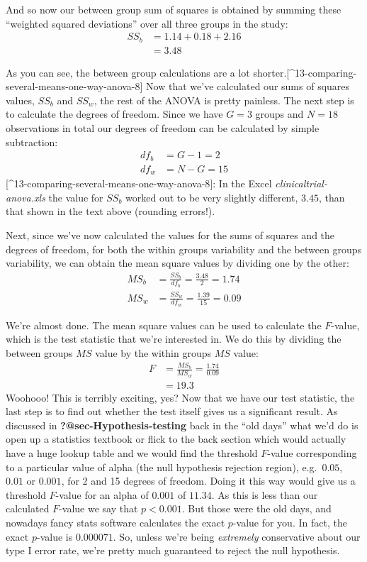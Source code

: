 \documentclass[
  a4paper,
]{book}
\begin{document}
And so now our between group sum of squares is obtained by summing these
``weighted squared deviations'' over all three groups in the study:
\[\begin{aligned} SS_b & = 1.14 + 0.18 + 2.16 \\ &= 3.48 \end{aligned}\]

As you can see, the between group calculations are a lot
shorter.{[}\^{}13-comparing-several-means-one-way-anova-8{]} Now that
we've calculated our sums of squares values, \(SS_b\) and \(SS_w\), the
rest of the ANOVA is pretty painless. The next step is to calculate the
degrees of freedom. Since we have \(G = 3\) groups and \(N = 18\)
observations in total our degrees of freedom can be calculated by simple
subtraction: \[
\begin{split}
df_b & = G-1 = 2 \\
df_w & = N-G = 15
\end{split}
\] {[}\^{}13-comparing-several-means-one-way-anova-8{]}: In the Excel
\emph{clinicaltrial-anova.xls} the value for \(SS_b\) worked out to be
very slightly different, \(3.45\), than that shown in the text above
(rounding errors!).

Next, since we've now calculated the values for the sums of squares and
the degrees of freedom, for both the within groups variability and the
between groups variability, we can obtain the mean square values by
dividing one by the other: \[
\begin{split}
MS_b & = \frac{SS_b}{df_b} = \frac{3.48}{2} = 1.74 \\
MS_w & = \frac{SS_w}{df_w} = \frac{1.39}{15} = 0.09
\end{split}
\]

We're almost done. The mean square values can be used to calculate the
\(F\)-value, which is the test statistic that we're interested in. We do
this by dividing the between groups \(MS\) value by the within groups
\(MS\) value: \[
\begin{split}
F & = \frac{MS_b}{MS_w}  = \frac{1.74}{0.09} \\
& = 19.3
\end{split}
\] Woohooo! This is terribly exciting, yes? Now that we have our test
statistic, the last step is to find out whether the test itself gives us
a significant result. As discussed in \textbf{?@sec-Hypothesis-testing}
back in the ``old days'' what we'd do is open up a statistics textbook
or flick to the back section which would actually have a huge lookup
table and we would find the threshold \(F\)-value corresponding to a
particular value of alpha (the null hypothesis rejection region),
e.g.~\(0.05\), \(0.01\) or \(0.001\), for 2 and 15 degrees of freedom.
Doing it this way would give us a threshold \(F\)-value for an alpha of
\(0.001\) of \(11.34\). As this is less than our calculated \(F\)-value
we say that \(p < 0.001\). But those were the old days, and nowadays
fancy stats software calculates the exact \(p\)-value for you. In fact,
the exact \(p\)-value is \(0.000071\). So, unless we're being
\emph{extremely} conservative about our type I error rate, we're pretty
much guaranteed to reject the null hypothesis.
\end{document}

